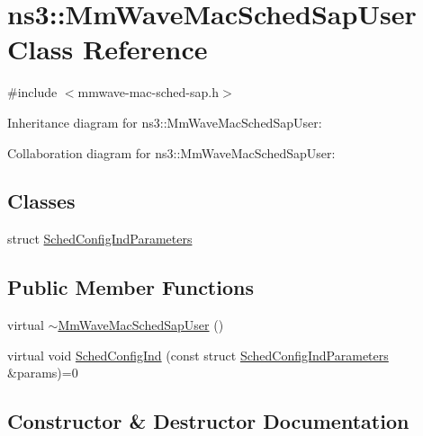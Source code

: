 \hypertarget{classns3_1_1MmWaveMacSchedSapUser}{}\section{ns3\+:\+:Mm\+Wave\+Mac\+Sched\+Sap\+User Class Reference}
\label{classns3_1_1MmWaveMacSchedSapUser}


{\ttfamily \#include $<$mmwave-\/mac-\/sched-\/sap.\+h$>$}



Inheritance diagram for ns3\+:\+:Mm\+Wave\+Mac\+Sched\+Sap\+User\+:


Collaboration diagram for ns3\+:\+:Mm\+Wave\+Mac\+Sched\+Sap\+User\+:
\subsection*{Classes}
\begin{DoxyCompactItemize}
\item 
struct \hyperlink{structns3_1_1MmWaveMacSchedSapUser_1_1SchedConfigIndParameters}{Sched\+Config\+Ind\+Parameters}
\end{DoxyCompactItemize}
\subsection*{Public Member Functions}
\begin{DoxyCompactItemize}
\item 
virtual \hyperlink{classns3_1_1MmWaveMacSchedSapUser_a4f618fa134ee75dbc0339d3636d53686}{$\sim$\+Mm\+Wave\+Mac\+Sched\+Sap\+User} ()
\item 
virtual void \hyperlink{classns3_1_1MmWaveMacSchedSapUser_ac164dd52215c3924cf421b56089eece4}{Sched\+Config\+Ind} (const struct \hyperlink{structns3_1_1MmWaveMacSchedSapUser_1_1SchedConfigIndParameters}{Sched\+Config\+Ind\+Parameters} \&params)=0
\end{DoxyCompactItemize}


\subsection{Constructor \& Destructor Documentation}
